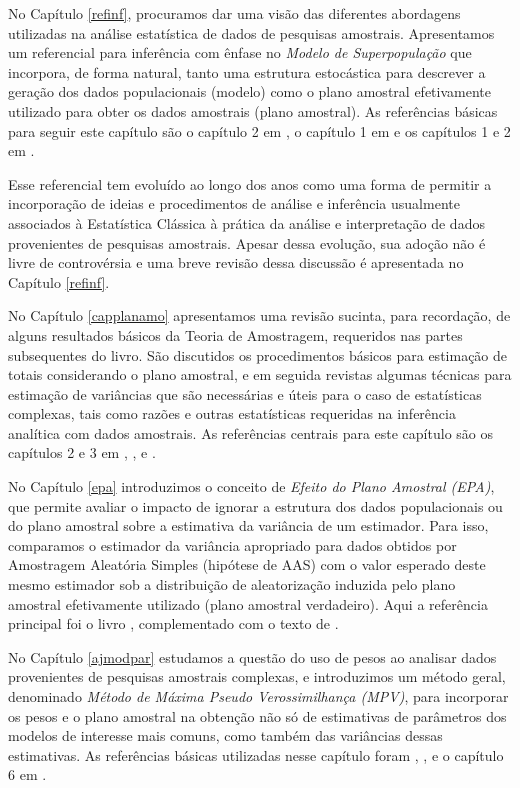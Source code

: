 \documentclass[
]{book}
\begin{document}
No Capítulo \ref{refinf}, procuramos dar uma visão das diferentes abordagens utilizadas na análise estatística de dados de pesquisas amostrais. Apresentamos um referencial para inferência com ênfase no \emph{Modelo de Superpopulação} que incorpora, de forma natural, tanto uma estrutura estocástica para descrever a geração dos dados populacionais (modelo) como o plano amostral efetivamente utilizado para obter os dados amostrais (plano amostral). As referências básicas para seguir este capítulo são o capítulo 2 em \citep{Silva}, o capítulo 1 em \citep{SHS89} e os capítulos 1 e 2 em \citep{CHSK2003}.

Esse referencial tem evoluído ao longo dos anos como uma forma de permitir a incorporação de ideias e procedimentos de análise e inferência usualmente associados à Estatística Clássica à prática da análise e interpretação de dados provenientes de pesquisas amostrais. Apesar dessa evolução, sua adoção não é livre de controvérsia e uma breve revisão dessa discussão é apresentada no Capítulo \ref{refinf}.

No Capítulo \ref{capplanamo} apresentamos uma revisão sucinta, para recordação, de alguns resultados básicos da Teoria de Amostragem, requeridos nas partes subsequentes do livro. São discutidos os procedimentos básicos para estimação de totais considerando o plano amostral, e em seguida revistas algumas técnicas
para estimação de variâncias que são necessárias e úteis para o caso de estatísticas complexas, tais como razões e outras estatísticas requeridas na inferência analítica com dados amostrais. As referências centrais para este capítulo são os capítulos 2 e 3 em \citep{SSW92}, \citep{Silva2020}, \citep{W85} e \citep{cochran}.

No Capítulo \ref{epa} introduzimos o conceito de \emph{Efeito do Plano Amostral (EPA)}, que permite avaliar o impacto de ignorar a estrutura dos dados populacionais ou do plano amostral sobre a estimativa da variância de um estimador. Para isso, comparamos o estimador da variância apropriado para dados obtidos por Amostragem Aleatória Simples (hipótese de AAS) com o valor esperado deste mesmo estimador sob a distribuição de aleatorização induzida pelo plano amostral efetivamente utilizado (plano amostral verdadeiro). Aqui a referência principal foi o livro \citep{SHS89}, complementado com o texto de \citep{lethonen}.

No Capítulo \ref{ajmodpar} estudamos a questão do uso de pesos ao analisar dados provenientes de pesquisas amostrais complexas, e introduzimos um método geral, denominado \emph{Método de Máxima Pseudo Verossimilhança (MPV)}, para incorporar os pesos e o plano amostral na obtenção não só de estimativas de parâmetros dos modelos de interesse mais comuns, como também das variâncias dessas estimativas. As referências básicas utilizadas nesse capítulo foram \citep{SHS89}, \citep{Pfeff}, \citep{binder83} e o capítulo 6 em \citep{Silva}.
\end{document}
